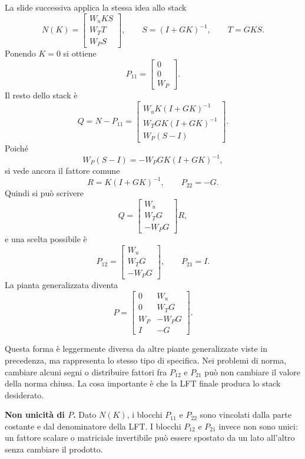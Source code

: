 \documentclass[11pt,a4paper]{article}
\begin{document}
La slide successiva applica la stessa idea allo stack
$$
N(K)=
\begin{bmatrix}
W_uKS\\
W_TT\\
W_PS
\end{bmatrix},
\qquad
S=(I+GK)^{-1},
\qquad
T=GKS.
$$
Ponendo $K=0$ si ottiene
$$
P_{11}=
\begin{bmatrix}
0\\
0\\
W_P
\end{bmatrix}.
$$
Il resto dello stack \`e
$$
Q=N-P_{11}
=
\begin{bmatrix}
W_uK(I+GK)^{-1}\\
W_TGK(I+GK)^{-1}\\
W_P(S-I)
\end{bmatrix}.
$$
Poich\'e
$$
W_P(S-I)=-W_PGK(I+GK)^{-1},
$$
si vede ancora il fattore comune
$$
R=K(I+GK)^{-1},
\qquad
P_{22}=-G.
$$
Quindi si pu\`o scrivere
$$
Q=
\begin{bmatrix}
W_u\\
W_TG\\
-W_PG
\end{bmatrix}
R,
$$
e una scelta possibile \`e
$$
P_{12}=
\begin{bmatrix}
W_u\\
W_TG\\
-W_PG
\end{bmatrix},
\qquad
P_{21}=I.
$$
La pianta generalizzata diventa
$$
P=
\begin{bmatrix}
0 & W_u\\
0 & W_TG\\
W_P & -W_PG\\
I & -G
\end{bmatrix}.
$$

Questa forma \`e leggermente diversa da altre piante generalizzate viste in precedenza, ma rappresenta lo stesso tipo di specifica. Nei problemi di norma, cambiare alcuni segni o distribuire fattori fra $P_{12}$ e $P_{21}$ pu\`o non cambiare il valore della norma chiusa. La cosa importante \`e che la LFT finale produca lo stack desiderato.

\begin{keybox}
\textbf{Non unicit\`a di $P$.} Dato $N(K)$, i blocchi $P_{11}$ e $P_{22}$ sono vincolati dalla parte costante e dal denominatore della LFT. I blocchi $P_{12}$ e $P_{21}$ invece non sono unici: un fattore scalare o matriciale invertibile pu\`o essere spostato da un lato all'altro senza cambiare il prodotto.
\end{keybox}
\end{document}

